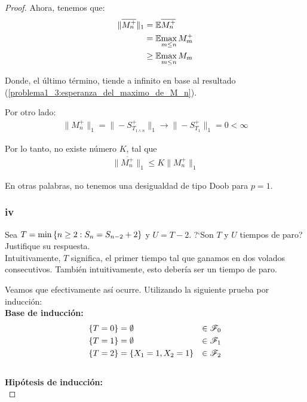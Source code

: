 \begin{proof}
			Ahora, tenemos que:
			\begin{align}
				\|\overline{M_{n}^{+}}\|_1  &=    \mathbb{E}{\overline{M_{n}^{+}}} \\
											&=    \mathbb{E}{\max_{m \leq n}M_m^+} \\
											&\geq \mathbb{E}{\max_{m \leq n}M_m}										
			\end{align}
				
			Donde, el último término, tiende a infinito en base al resultado 
			(\ref{problema1_3:esperanza_del_maximo_de_M_n}).

			Por otro lado:
			\begin{align}
				\|M_n^+\|_1=\|-S_{T_{1\wedge n}}^{+}\|_1  \longrightarrow  \|-S_{T_1}^+\|_1 = 0 < \infty
			\end{align}
			
			Por lo tanto, no existe número $K$, tal que
			\begin{align}
				 \|\overline{M_n^+}\|_1 \leq  K \|M_n^+\|_1
			\end{align}
			
			En otras palabras, no tenemos una desigualdad de tipo Doob para $p=1$.\\
			
		\subsubsection{iv}
		Sea $T=\min\left\{ n\geq 2:S_n=S_{n-2} + 2\right\} $ y $U=T-2$. ?`Son $T$ y $U$ 
		tiempos de paro? Justifique su respuesta.\\
					
			Intuitivamente, $T$ significa, el primer tiempo tal que ganamos en dos volados consecutivos.
			También intuitivamente, esto debería ser un tiempo de paro.
			
			Veamos que efectivamente así ocurre. Utilizando la siguiente prueba por inducción:\\
			
			\textbf{Base de inducción:}		
				\begin{align}
					\{T = 0\} 		&= \emptyset  				& 	\in \mathscr{F}_0 \\
					\{T = 1\} 		&= \emptyset  				& 	\in \mathscr{F}_1 \\
			   		\{T = 2\} 		&= \{ X_1 = 1, X_2 = 1\} 	&	\in \mathscr{F}_2
				\end{align}	\\					
			
			\textbf{Hipótesis de inducción:}\\
			

\end{proof}
